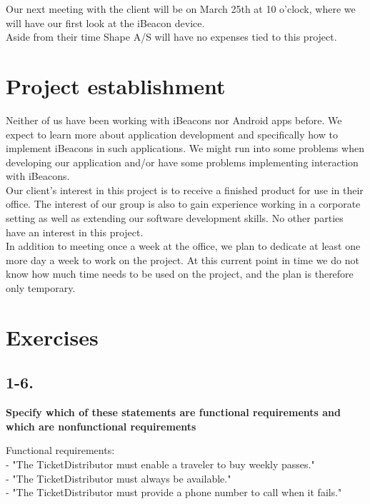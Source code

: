 \documentclass[12pt]{article}
\begin{document}
Our next meeting with the client will be on March 25th at 10 o'clock, where we will have our first look at the iBeacon device.\\

Aside from their time Shape A/S will have no expenses tied to this project.










\section{Project establishment}

Neither of us have been working with iBeacons nor Android apps before. We expect to learn more about application development and specifically how to implement iBeacons in such applications. We might run into some problems when developing our application and/or have some problems implementing interaction with iBeacons.\\

Our client's interest in this project is to receive a finished product for use in their office. The interest of our group is also to gain experience working in a corporate setting as well as extending our software development skills. No other parties have an interest in this project.\\

In addition to meeting once a week at the office, we plan to dedicate at least one more day a week to work on the project. At this current point in time we do not know how much time needs to be used on the project, and the plan is therefore only temporary.










\newpage
\section{Exercises}

\subsection{1-6.}
\textbf{Specify which of these statements are functional requirements and which are
nonfunctional requirements}

Functional requirements:\\
- "The TicketDistributor must enable a traveler to buy weekly passes."\\
- "The TicketDistributor must always be available."\\
- "The TicketDistributor must provide a phone number to call when it fails."\\
\end{document}
